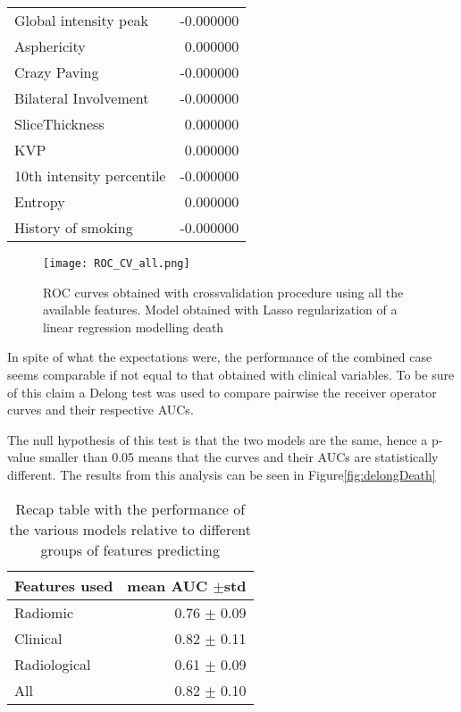 \begin{table}
\begin{tabular}{lr}
			Global intensity peak               &                     -0.000000 \\
			Asphericity                         &                      0.000000 \\
			Crazy Paving                        &                     -0.000000 \\
			Bilateral Involvement               &                     -0.000000 \\
			SliceThickness                      &                      0.000000 \\
			KVP                                 &                      0.000000 \\
			10th intensity percentile           &                     -0.000000 \\
			Entropy                             &                      0.000000 \\
			History of smoking                  &                     -0.000000 \\
			\bottomrule
\end{tabular}
\end{table}

\begin{figure}[htbp]
	\centering
  		\texttt{[image: ROC\_CV\_all.png]}
        \caption{ROC curves obtained with crossvalidation procedure using all the available features. Model obtained with Lasso regularization of a linear regression modelling death\label{fig:RocDeathAll}}
\end{figure}

In spite of what the expectations were, the performance of the combined case seems comparable if not equal to that obtained with clinical variables. To be sure of this claim a Delong test was used to compare pairwise the receiver operator curves and their respective AUCs. 

The null hypothesis of this test is that the two models are the same, hence a p-value smaller than 0.05 means that the curves and their AUCs are statistically different. The results from this analysis can be seen in Figure\ref{fig:delongDeath}

\begin{table}
\caption{Recap table with the performance of the various models relative to different groups of features predicting \death \label{tab:RecapDeath}}
\centering
\begin{tabular}{l|r}
\toprule
Features used & mean AUC $\pm$std\\
\midrule
Radiomic  & 0.76 $\pm$ 0.09\\
Clinical  &  0.82 $\pm$ 0.11\\
Radiological & 0.61 $\pm$ 0.09\\
All & 0.82 $\pm$ 0.10 \\
\bottomrule
\end{tabular}
\end{table}


